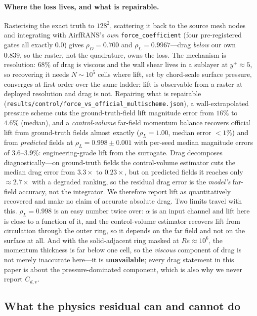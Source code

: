 \paragraph{Where the loss lives, and what is repairable.} Rasterising the exact truth to
$128^2$, scattering it back to the source mesh nodes and integrating with AirfRANS's
\emph{own} \texttt{force\_coefficient} (four pre-registered gates all exactly $0.0$) gives
$\rho_D=0.700$ and $\rho_L=0.9967$---drag \emph{below} our own $0.839$, so the raster, not
the quadrature, owns the loss. The mechanism is resolution: $68\%$ of drag
is viscous and the wall shear lives in a sublayer at $y^+\!\approx\!5$, so recovering it
needs $N\sim10^5$ cells where lift, set by chord-scale surface pressure, converges at
first order over the same ladder: lift is observable from a raster at deployed resolution
and drag is not. Repairing what is
repairable (\texttt{results\slash{}control\slash{}force\_vs\_official\_multischeme.json}), a
wall-extrapolated pressure scheme cuts the ground-truth-field lift magnitude error from
$16\%$ to $4.6\%$ (median), and a \emph{control-volume} far-field momentum balance
recovers official lift from ground-truth fields almost exactly ($\rho_L=1.00$, median
error $<1\%$) and from \emph{predicted} fields at $\rho_L = 0.998{\pm}0.001$ with per-seed
median magnitude errors of $3.6$--$3.9\%$: engineering-grade lift from the surrogate. Drag
decomposes diagnostically---on ground-truth fields the control-volume estimator cuts the
median drag error from $3.3\times$ to $0.23\times$, but on predicted fields it reaches only
$\approx 2.7\times$ with a degraded ranking, so the residual drag error is the
\emph{model's} far-field accuracy, not the integrator. We therefore report lift as
quantitatively recovered and make no claim of accurate absolute drag. Two limits travel
with this. $\rho_L=0.998$ is an easy number twice over: $\alpha$ is an input channel and
lift here is close to a function of it, and the control-volume estimator recovers lift from
circulation through the outer ring, so it depends on the far field and not on the surface
at all. And with the solid-adjacent ring masked at $Re\approx10^6$, the momentum thickness
is far below one cell, so the \emph{viscous} component of drag is not merely inaccurate
here---it is \textbf{unavailable}; every drag statement in this paper is about the
pressure-dominated component, which is also why we never report $C_{d,v}$.

\subsection{What the physics residual can and cannot do}
\label{sec:residual}

